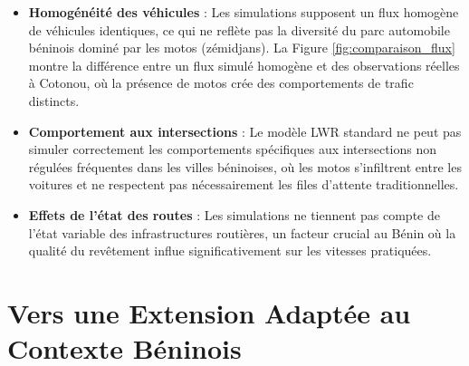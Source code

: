 \begin{itemize}
    \item \textbf{Homogénéité des véhicules} : Les simulations supposent un flux homogène de véhicules identiques, ce qui ne reflète pas la diversité du parc automobile béninois dominé par les motos (zémidjans). La Figure \ref{fig:comparaison_flux} montre la différence entre un flux simulé homogène et des observations réelles à Cotonou, où la présence de motos crée des comportements de trafic distincts.
    \item \textbf{Comportement aux intersections} : Le modèle LWR standard ne peut pas simuler correctement les comportements spécifiques aux intersections non régulées fréquentes dans les villes béninoises, où les motos s'infiltrent entre les voitures et ne respectent pas nécessairement les files d'attente traditionnelles.
    \item \textbf{Effets de l'état des routes} : Les simulations ne tiennent pas compte de l'état variable des infrastructures routières, un facteur crucial au Bénin où la qualité du revêtement influe significativement sur les vitesses pratiquées.
\end{itemize}

\section{Vers une Extension Adaptée au Contexte Béninois}

